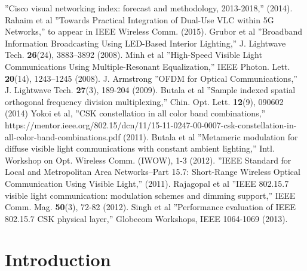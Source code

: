 \documentclass[10pt,letterpaper]{article}
\begin{document}
\begin{thebibliography}{99}
 ''{Cisco visual networking index: forecast and methodology, 2013-2018},'' (2014).
 Rahaim et al ''{Towards Practical Integration of Dual-Use VLC within 5G Networks},'' to appear in IEEE Wireless Comm. (2015).
 Grubor et al ''{Broadband Information Broadcasting Using LED-Based Interior Lighting},'' J. Lightwave Tech. {\bf 26}(24), 3883--3892 (2008).
 Minh et al ''{High-Speed Visible Light Communications Using Multiple-Resonant Equalization},'' IEEE Photon. Lett. {\bf 20}(14), 1243--1245 (2008).
 J. Armstrong ''{OFDM for Optical Communications},'' J. Lightwave Tech. {\bf 27}(3), 189-204 (2009).
 Butala et al ''{Sample indexed spatial orthogonal frequency division multiplexing},'' Chin. Opt. Lett. {\bf 12}(9), 090602 (2014)
 Yokoi et al, ''{CSK constellation in all color band combinations},'' {https://mentor.ieee.org/802.15/dcn/11/15-11-0247-00-0007-csk-constellation-in-all-color-band-combinations.pdf} (2011).
 Butala et al ''{Metameric modulation for diffuse visible light communications with constant ambient lighting},'' Intl. Workshop on Opt. Wireless Comm. (IWOW), 1-3 (2012).
 ''{IEEE Standard for Local and Metropolitan Area Networks--Part 15.7: Short-Range Wireless Optical Communication Using Visible Light},'' (2011).
 Rajagopal et al ''{IEEE 802.15.7 visible light communication: modulation schemes and dimming support},'' IEEE Comm. Mag. {\bf 50}(3), 72-82 (2012).
 Singh et al ''{Performance evaluation of IEEE 802.15.7 CSK physical layer},'' Globecom Workshops, IEEE 1064-1069 (2013).


\end{thebibliography}

\section{Introduction}\label{sINTR}
\end{document}
